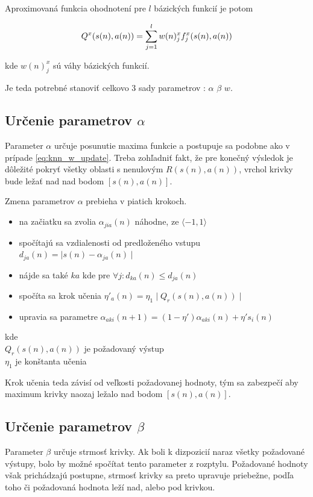 Aproximovaná funkcia ohodnotení pre $l$ bázických funkcií je potom

\begin{align}
Q^x(s(n), a(n)) = \sum\limits_{j=1}^{l} w(n)_j^x f_j^x(\boldmath{s(n), a(n)})
\label{eq:knn_y_update}
\end{align}

kde $w(n)_j^x$ sú váhy bázických funkcií.


Je teda potrebné stanoviť celkovo 3 sady parametrov : $\alpha$ $\beta$ $w$.

\subsection{Určenie parametrov $\alpha$}

Parameter $\alpha$ určuje posunutie maxima funkcie a postupuje sa podobne
ako v prípade \ref{eq:knn_w_update}. Treba zohľadniť fakt, že pre konečný
výsledok je dôležité pokryť všetky oblasti s nenulovým $R(s(n),a(n))$, vrchol
krivky bude ležať nad nad bodom $[s(n),a(n)]$.

Zmena parametrov $\alpha$ prebieha v piatich krokoch.

\begin{itemize}
  \item na začiatku sa zvolia $\alpha_{jia}(n)$ náhodne, ze $\langle -1, 1 \rangle$
  \item spočítajú sa vzdialenosti od predloženého vstupu $d_{ja}(n) = \mid s(n) - \alpha_{ja}(n) \mid$
  \item nájde sa také $ka$ kde pre $\forall{j} : d_{ka}(n) \leq d_{ja}(n)$
  \item spočíta sa krok učenia $\eta'_a(n) = \eta_1 \mid Q_r(s(n), a(n)) \mid$
  \item upravia sa parametre $\alpha_{aki}(n+1) = (1 - \eta')\alpha_{aki}(n) + \eta' s_{i}(n)$
\end{itemize}
kde \\
$Q_r(s(n), a(n))$ je požadovaný výstup \\
$\eta_1$ je konštanta učenia

Krok učenia teda závisí od veľkosti požadovanej hodnoty, tým sa zabezpečí aby maximum
krivky naozaj ležalo nad bodom $[s(n),a(n)]$.

\subsection{Určenie parametrov $\beta$}

Parameter $\beta$ určuje strmosť krivky. Ak boli k dizpozicií naraz všetky
požadované výstupy, bolo by možné spočítat tento parameter z rozptylu.
Požadované hodnoty však prichádzajú postupne, strmosť krivky sa preto upravuje priebežne,
podľa toho či požadovaná hodnota leží nad, alebo pod krivkou.

